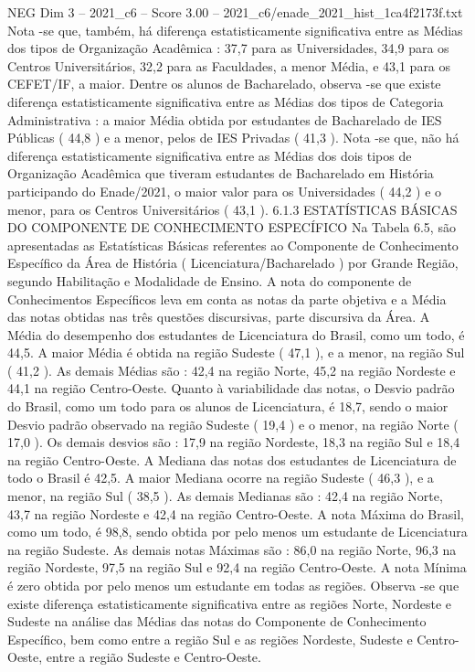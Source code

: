 \begin{textsample}{NEG Dim 3 – 2021\_c6 – Score 3.00 – 2021\_c6/enade\_2021\_hist\_1ca4f2173f.txt}
Nota -se que, também, há diferença estatisticamente significativa entre as Médias dos tipos de Organização Acadêmica : 37,7 para as Universidades, 34,9 para os Centros Universitários, 32,2 para as Faculdades, a menor Média, e 43,1 para os CEFET/IF, a maior.
Dentre os alunos de Bacharelado, observa -se que existe diferença estatisticamente significativa entre as Médias dos tipos de Categoria Administrativa : a maior Média obtida por estudantes de Bacharelado de IES Públicas ( 44,8 ) e a menor, pelos de IES Privadas ( 41,3 ).
Nota -se que, não há diferença estatisticamente significativa entre as Médias dos dois tipos de Organização Acadêmica que tiveram estudantes de Bacharelado em História participando do Enade/2021, o maior valor para os Universidades ( 44,2 ) e o menor, para os Centros Universitários ( 43,1 ). 6.1.3 ESTATÍSTICAS BÁSICAS DO COMPONENTE DE CONHECIMENTO ESPECÍFICO Na Tabela 6.5, são apresentadas as Estatísticas Básicas referentes ao Componente de Conhecimento Específico da Área de História ( Licenciatura/Bacharelado ) por Grande Região, segundo Habilitação e Modalidade de Ensino.
A nota do componente de Conhecimentos Específicos leva em conta as notas da parte objetiva e a Média das notas obtidas nas três questões discursivas, parte discursiva da Área.
A Média do desempenho dos estudantes de Licenciatura do Brasil, como um todo, é 44,5.
A maior Média é obtida na região Sudeste ( 47,1 ), e a menor, na região Sul ( 41,2 ).
As demais Médias são : 42,4 na região Norte, 45,2 na região Nordeste e 44,1 na região Centro-Oeste.
Quanto à variabilidade das notas, o Desvio padrão do Brasil, como um todo para os alunos de Licenciatura, é 18,7, sendo o maior Desvio padrão observado na região Sudeste ( 19,4 ) e o menor, na região Norte ( 17,0 ).
Os demais desvios são : 17,9 na região Nordeste, 18,3 na região Sul e 18,4 na região Centro-Oeste.
A Mediana das notas dos estudantes de Licenciatura de todo o Brasil é 42,5.
A maior Mediana ocorre na região Sudeste ( 46,3 ), e a menor, na região Sul ( 38,5 ).
As demais Medianas são : 42,4 na região Norte, 43,7 na região Nordeste e 42,4 na região Centro-Oeste.
A nota Máxima do Brasil, como um todo, é 98,8, sendo obtida por pelo menos um estudante de Licenciatura na região Sudeste.
As demais notas Máximas são : 86,0 na região Norte, 96,3 na região Nordeste, 97,5 na região Sul e 92,4 na região Centro-Oeste.
A nota Mínima é zero obtida por pelo menos um estudante em todas as regiões.
Observa -se que existe diferença estatisticamente significativa entre as regiões Norte, Nordeste e Sudeste na análise das Médias das notas do Componente de Conhecimento Específico, bem como entre a região Sul e as regiões Nordeste, Sudeste e Centro-Oeste, entre a região Sudeste e Centro-Oeste.

\end{textsample}
